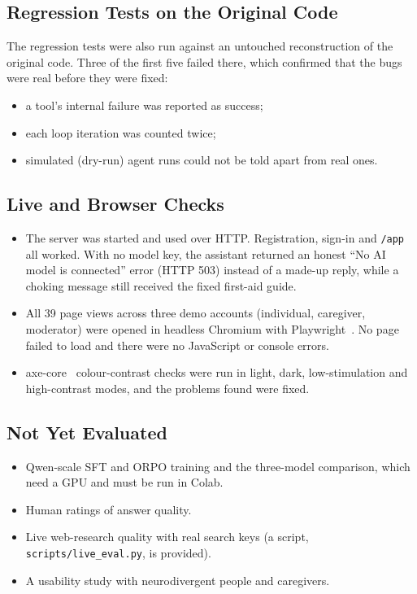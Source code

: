 \documentclass[11pt,a4paper]{article}
\newcommand{\code}[1]{\texttt{#1}}
\begin{document}
\subsection{Regression Tests on the Original Code}
The regression tests were also run against an untouched reconstruction of the original code. Three of
the first five failed there, which confirmed that the bugs were real before they were fixed:
\begin{itemize}
  \item a tool's internal failure was reported as success;
  \item each loop iteration was counted twice;
  \item simulated (dry-run) agent runs could not be told apart from real ones.
\end{itemize}

\subsection{Live and Browser Checks}
\begin{itemize}
  \item The server was started and used over HTTP. Registration, sign-in and \code{/app} all worked. With no model key, the assistant returned an honest ``No AI model is connected'' error (HTTP 503) instead of a made-up reply, while a choking message still received the fixed first-aid guide.
  \item All 39 page views across three demo accounts (individual, caregiver, moderator) were opened in headless Chromium with Playwright~\cite{playwright}. No page failed to load and there were no JavaScript or console errors.
  \item axe-core~\cite{axe} colour-contrast checks were run in light, dark, low-stimulation and high-contrast modes, and the problems found were fixed.
\end{itemize}

\subsection{Not Yet Evaluated}
\begin{itemize}
  \item Qwen-scale SFT and ORPO training and the three-model comparison, which need a GPU and must be run in Colab.
  \item Human ratings of answer quality.
  \item Live web-research quality with real search keys (a script, \code{scripts/live\_eval.py}, is provided).
  \item A usability study with neurodivergent people and caregivers.
\end{itemize}
\end{document}
